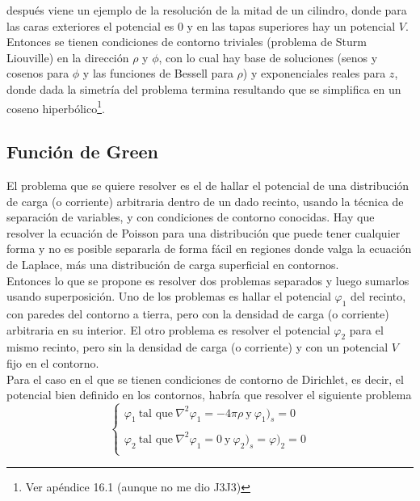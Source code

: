 después viene un ejemplo de la resolución de la mitad de un cilindro, donde para las caras exteriores el potencial es $0$ y en las tapas superiores hay un potencial $V$. Entonces se tienen condiciones de contorno triviales (problema de Sturm Liouville) en la dirección $\rho$ y $\phi$, con lo cual hay base de soluciones (senos y cosenos para $\phi$ y las funciones de Bessell para $\rho$) y exponenciales reales para $z$, donde dada la simetría del problema termina resultando que se simplifica en un coseno hiperbólico\footnote{Ver apéndice 16.1 (aunque no me dio J3J3)}.




\subsection{Función de Green}
El problema que se quiere resolver es el de hallar el potencial de una distribución de carga (o corriente) arbitraria dentro de un dado recinto, usando la técnica de separación de variables, y con condiciones de contorno conocidas. Hay que resolver la ecuación de Poisson para una distribución que puede tener cualquier forma y no es posible separarla de forma fácil en regiones donde valga la ecuación de Laplace, más una distribución de carga superficial en contornos.\\
\indent Entonces lo que se propone es resolver dos problemas separados y luego sumarlos usando superposición. Uno de los problemas es hallar el potencial $\varphi_{1}$ del recinto, con paredes del contorno a tierra, pero con la densidad de carga (o corriente) arbitraria en su interior. El otro problema es resolver el potencial $\varphi_{2}$ para el mismo recinto, pero sin la densidad de carga (o corriente) y con un potencial $V$ fijo en el contorno.\\
\indent Para el caso en el que se tienen condiciones de contorno de Dirichlet, es decir, el potencial bien definido en los contornos, habría que resolver el siguiente problema
\begin{equation*}
    \left\{
        \begin{matrix}
            \varphi_{1}\ \mbox{tal que}\ 
            \nabla^{2}\varphi_{1} = -4\pi\rho\ \mbox{y}\ \varphi_{1}\big)_{s} = 0\\
            \\
            \varphi_{2}\ \mbox{tal que}\ 
            \nabla^{2}\varphi_{1} = 0\ \mbox{y}\ \varphi_{2}\big)_{s} = \varphi\big)_{2} = 0\\
        \end{matrix}
    \right.
\end{equation*}
